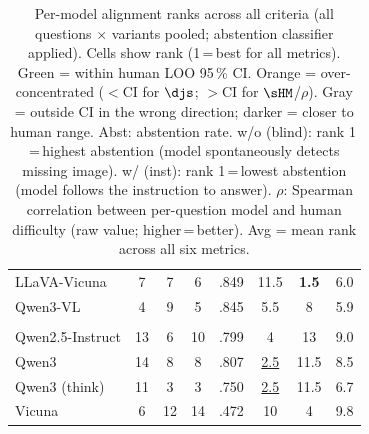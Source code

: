 \begin{table}[t]
\begin{tabular}{>{\raggedright\arraybackslash}p{2.6cm}ccccccc}
LLaVA-Vicuna & \cellcolor{orange!30}7 & \cellcolor{gray!10}7 & \cellcolor{green!20}6 & \cellcolor{gray!15}.849 & \cellcolor{gray!5}11.5 & \cellcolor{gray!20}\textbf{1.5} & \cellcolor{gray!10}6.0 \\
Qwen3-VL & \cellcolor{orange!30}4 & \cellcolor{gray!5}9 & \cellcolor{green!20}5 & \cellcolor{gray!15}.845 & \cellcolor{gray!15}5.5 & \cellcolor{gray!10}8 & \cellcolor{gray!15}5.9 \\
\midrule
\multicolumn{8}{c}{\textit{SA-LLMs}}\\
\midrule
Qwen2.5-Instruct & \cellcolor{gray!5}13 & \cellcolor{gray!10}6 & \cellcolor{green!20}10 & \cellcolor{gray!10}.799 & \cellcolor{gray!15}4 & 13 & \cellcolor{gray!5}9.0 \\
Qwen3 & 14 & \cellcolor{gray!10}8 & \cellcolor{green!20}8 & \cellcolor{gray!10}.807 & \cellcolor{gray!20}\underline{2.5} & \cellcolor{gray!5}11.5 & \cellcolor{gray!10}8.5 \\
Qwen3 (think) & \cellcolor{gray!10}11 & \cellcolor{gray!15}3 & \cellcolor{green!20}3 & \cellcolor{gray!10}.750 & \cellcolor{gray!20}\underline{2.5} & \cellcolor{gray!5}11.5 & \cellcolor{gray!10}6.7 \\
Vicuna & \cellcolor{orange!30}6 & \cellcolor{gray!5}12 & 14 & .472 & \cellcolor{gray!5}10 & \cellcolor{gray!15}4 & 9.8 \\
\bottomrule
\end{tabular}
\caption{Per-model alignment ranks across all criteria (all questions $\times$ variants pooled; abstention classifier applied). Cells show rank (1\,=\,best for all metrics). \colorbox{green!20}{Green} = within human LOO 95\,\% CI. \colorbox{orange!30}{Orange} = over-concentrated ($<$CI for $\djs$; $>$CI for $\sHM$/$\rho$). \colorbox{gray!15}{Gray} = outside CI in the wrong direction; darker = closer to human range. Abst: abstention rate. w/o (blind): rank 1\,=\,highest abstention (model spontaneously detects missing image). w/ (inst): rank 1\,=\,lowest abstention (model follows the instruction to answer). $\rho$: Spearman correlation between per-question model and human difficulty (raw value; higher\,=\,better). Avg = mean rank across all six metrics.}
\label{tab:alignment_ranking_7b}
\end{table}
